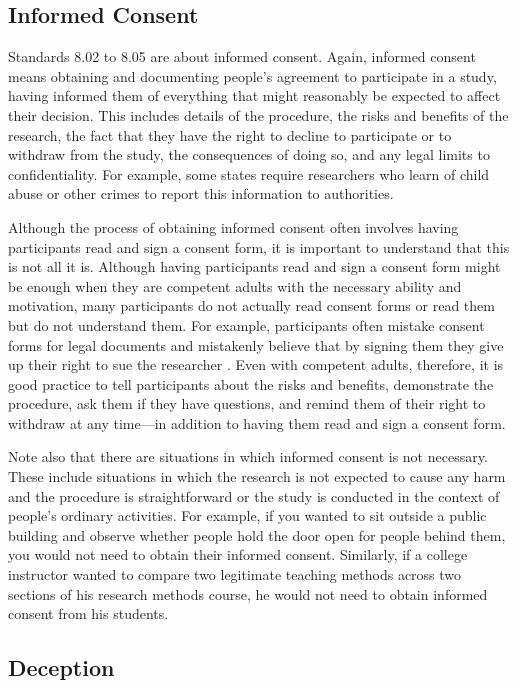 \subsection{Informed Consent}


Standards 8.02 to 8.05 are about informed consent. Again, informed consent means obtaining and documenting people's agreement to participate in a study, having informed them of everything that might reasonably be expected to affect their decision. This includes details of the procedure, the risks and benefits of the research, the fact that they have the right to decline to participate or to withdraw from the study, the consequences of doing so, and any
legal limits to confidentiality. For example, some states require researchers who learn of child abuse or other crimes to report this information to authorities.


Although the process of obtaining informed consent often involves having participants read and sign a consent form, it is important to understand that this is not all it is. Although having participants read and sign a consent form might be enough when they are competent adults with the necessary ability and motivation, many participants do not actually read consent forms or read them but do not understand them. For example, participants often mistake consent forms for legal documents and mistakenly believe that by signing them they give up their right to sue the researcher \citep{mann_informed_1994}. Even with competent adults, therefore, it is good practice to tell participants about the risks and benefits, demonstrate the procedure, ask them if they have questions, and remind them of their right to withdraw at any time---in addition to having them read and sign a consent form.


Note also that there are situations in which informed consent is not necessary. These include situations in which the research is not expected to cause any harm and the procedure is straightforward or the study is conducted in the context of people's ordinary activities. For example, if you wanted to sit outside a public building and observe whether people hold the door open for people behind them, you would not need to obtain their informed consent. Similarly, if a college instructor wanted to compare two legitimate teaching methods across two sections of his research methods course, he would not need to obtain informed consent from his students.


\subsection{Deception}


